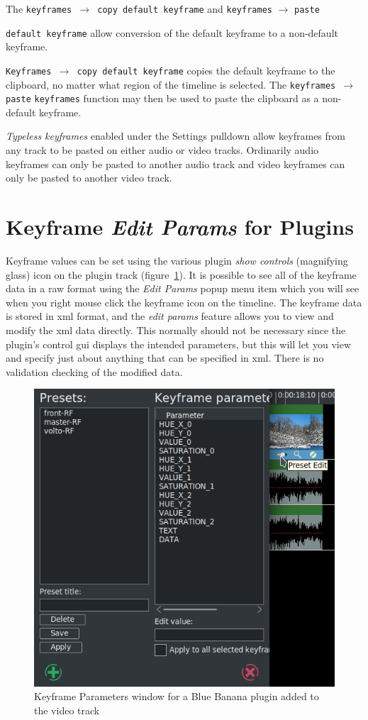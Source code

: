 The \texttt{keyframes $\rightarrow$ copy default keyframe} and \texttt{keyframes} $\rightarrow$ \texttt{paste} {\texttt{de\-fault keyframe} allow conversion of the default keyframe to a non-default keyframe.

\texttt{Keyframes $\rightarrow$ copy default keyframe} copies the default keyframe to the clipboard, no matter what region of the timeline is selected.  
The \texttt{keyframes $\rightarrow$ paste} \texttt{keyframes} function may then be used to paste the clipboard as a non-default keyframe.  

\textit{Typeless keyframes} enabled under the Settings pulldown allow keyframes from any track to be pasted on either audio or video tracks.  Ordinarily audio keyframes can only be pasted to another audio track and video keyframes can only be pasted to another video track.

\section{Keyframe \textit{Edit Params} for Plugins}%
\label{sec:keyframe_edit_params_plugin}

Keyframe values can be set using the various plugin \textit{show controls} (magnifying glass) icon on the plugin track (figure~\ref{fig:parameters}).  It is possible to see all of the keyframe data in a raw format using the \textit{Edit Params} popup menu item which you will see when you right mouse click the keyframe icon on the timeline.  The keyframe data is stored in xml format, and the \textit{edit params} feature allows you to view and modify the xml data directly.  This normally should not be necessary since the plugin's control gui displays the intended parameters, but this will let you view and specify just about anything that can be specified in xml.  There is no validation checking of the modified data.

\begin{figure}[htpb]
    \centering
    \includegraphics[width=0.8\linewidth]{images/parameters.png}
    \caption{Keyframe Parameters window for a Blue Banana plugin added to the video track}
    \label{fig:parameters}
\end{figure}

}
